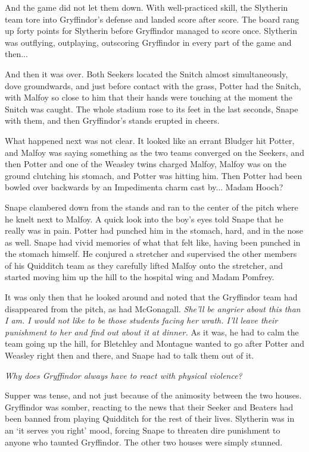 \documentclass[a4paper,11pt]{article}
\begin{document}
And the game did not let them down. With well-practiced skill, the Slytherin team tore into Gryffindor's defense and landed score after score. The board rang up forty points for Slytherin before Gryffindor managed to score once. Slytherin was outflying, outplaying, outscoring Gryffindor in every part of the game and then...

And then it was over. Both Seekers located the Snitch almost simultaneously, dove groundwards, and just before contact with the grass, Potter had the Snitch, with Malfoy so close to him that their hands were touching at the moment the Snitch was caught. The whole stadium rose to its feet in the last seconds, Snape with them, and then Gryffindor's stands erupted in cheers.

What happened next was not clear. It looked like an errant Bludger hit Potter, and Malfoy was saying something as the two teams converged on the Seekers, and then Potter and one of the Weasley twins charged Malfoy, Malfoy was on the ground clutching his stomach, and Potter was hitting him. Then Potter had been bowled over backwards by an Impedimenta charm cast by... Madam Hooch?

Snape clambered down from the stands and ran to the center of the pitch where he knelt next to Malfoy. A quick look into the boy's eyes told Snape that he really was in pain. Potter had punched him in the stomach, hard, and in the nose as well. Snape had vivid memories of what that felt like, having been punched in the stomach himself. He conjured a stretcher and supervised the other members of his Quidditch team as they carefully lifted Malfoy onto the stretcher, and started moving him up the hill to the hospital wing and Madam Pomfrey.

It was only then that he looked around and noted that the Gryffindor team had disappeared from the pitch, as had McGonagall. \emph{She'll be angrier about this than I am. I would not like to be those students facing her wrath. I'll leave their punishment to her and find out about it at dinner.} As it was, he had to calm the team going up the hill, for Bletchley and Montague wanted to go after Potter and Weasley right then and there, and Snape had to talk them out of it.

\emph{Why does Gryffindor always have to react with physical violence?}

Supper was tense, and not just because of the animosity between the two houses. Gryffindor was somber, reacting to the news that their Seeker and Beaters had been banned from playing Quidditch for the rest of their lives. Slytherin was in an `it serves you right' mood, forcing Snape to threaten dire punishment to anyone who taunted Gryffindor. The other two houses were simply stunned.
\end{document}
